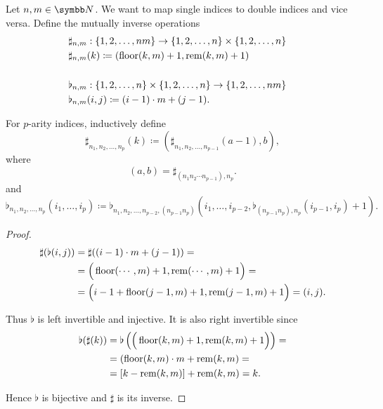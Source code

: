\begin{definition}\label{def:double_index_maps}
  Let \( n, m \in \BB{N} \). We want to map single indices to double indices and vice versa. Define the mutually inverse operations
  \begin{align*}
    &\sharp_{n,m}: \{ 1, 2, \ldots, nm \} \to \{ 1, 2, \ldots, n \} \times \{ 1, 2, \ldots, n \} \\
    &\sharp_{n,m}(k) \coloneqq (\operatorname{floor}(k, m) + 1, \operatorname{rem}(k, m) + 1)
    &\\
    &\\
    &\flat_{n,m}: \{ 1, 2, \ldots, n \} \times \{ 1, 2, \ldots, n \} \to \{ 1, 2, \ldots, nm \} \\
    &\flat_{n,m}(i, j) \coloneqq (i - 1) \cdot m + (j - 1).
  \end{align*}

  For \( p \)-arity indices, inductively define
  \begin{equation*}
    \sharp_{n_1, n_2, \ldots, n_p}(k) \coloneqq (\sharp_{n_1, n_2, \ldots, n_{p-1}}(a - 1), b),
  \end{equation*}
  where
  \begin{equation*}
    (a, b) = \sharp_{(n_1 n_2 \cdots n_{p-1}), n_p}.
  \end{equation*}
  and
  \begin{equation*}
    \flat_{n_1, n_2, \ldots, n_p}(i_1, \ldots, i_p) \coloneqq \flat_{n_1, n_2, \ldots, n_{p-2}, (n_{p-1} n_p)}(i_1, \ldots, i_{p-2}, \flat_{(n_{p-1} n_p), n_p}(i_{p-1}, i_p) + 1).
  \end{equation*}
\end{definition}
\begin{proof}
  \begin{align*}
    \sharp(\flat(i, j))
    &=
    \sharp((i - 1) \cdot m + (j - 1))
    = \\ &=
    \Big( \operatorname{floor}( \cdots, m) + 1, \operatorname{rem}( \cdots, m) + 1 \Big)
    = \\ &=
    \Big( i - 1 + \operatorname{floor}(j - 1, m) + 1, \operatorname{rem}(j - 1, m) + 1 \Big)
    =
    (i, j).
  \end{align*}

  Thus \( \flat \) is left invertible and injective. It is also right invertible since
  \begin{align*}
    \flat(\sharp(k))
    &=
    \flat\left( \Big( \operatorname{floor}(k, m) + 1, \operatorname{rem}(k, m) + 1 \Big) \right)
    = \\ &=
    (\operatorname{floor}(k, m) \cdot m + \operatorname{rem}(k, m)
    = \\ &=
    [k - \operatorname{rem}(k, m)] + \operatorname{rem}(k, m)
    =
    k.
  \end{align*}

  Hence \( \flat \) is bijective and \( \sharp \) is its inverse.
\end{proof}

